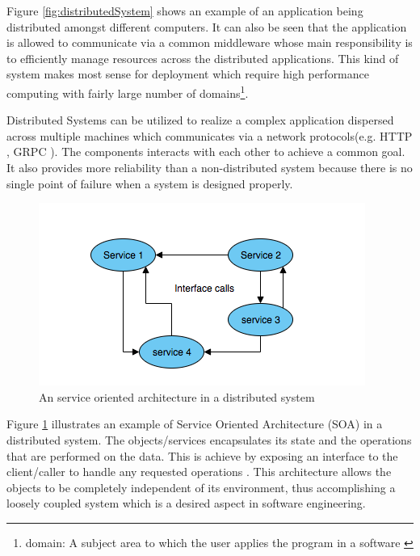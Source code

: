     \newpage
    \par
        Figure \ref{fig:distributedSystem} shows an example of an application being 
        distributed amongst different computers. It can also be seen that the application
        is allowed to communicate via a common middleware whose main responsibility is to
        efficiently manage resources across the distributed applications. This kind of system
        makes most sense for deployment which require high performance computing with fairly
        large number of domains\footnote{domain: A subject area to which the user applies the program in a 
        software \cite{DDD}}.

    \par
        Distributed Systems can be utilized to realize a complex application dispersed across
        multiple machines which communicates via a network protocols(e.g. HTTP \cite{HTTP}, 
        GRPC \cite{grpc}). The 
        components interacts with each other to achieve a common goal. It also provides
        more reliability than a non-distributed system because there is no single point
        of failure when a system is designed properly. 

    \begin{figure}[H]
        \centering \includegraphics[scale=0.7]{grafiken/objectBasedDS.png}
        \caption{An service oriented architecture in a distributed system 
            \cite[p.~62]{DistributedSystems}}
        \label{fig:objectBasedDS}
    \end{figure}

    \par
        Figure \ref{fig:objectBasedDS} illustrates an example of Service Oriented Architecture 
        (SOA) in a distributed system. The objects/services encapsulates its state and 
        the operations that are performed on the data. This is achieve by exposing an 
        interface to the client/caller to handle any requested operations
        \cite{DistributedSystems}. This architecture allows the objects to be
        completely independent of its environment, thus accomplishing a loosely
        coupled system which is a desired aspect in software engineering.
        
